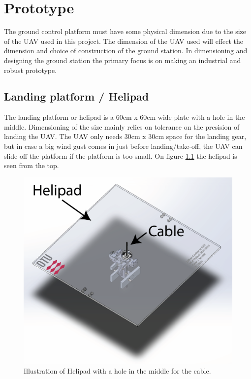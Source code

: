 
\chapter{Prototype}
The ground control platform must have some physical dimension due to the size of the UAV used in this project. The dimension of the UAV used will effect the dimension and choice of construction of the ground station. In dimensioning and designing the ground station the primary focus is on making an industrial and robust prototype. 


\section{Landing platform / Helipad}
The landing platform or helipad is a 60cm x 60cm wide plate with a hole in the middle. Dimensioning of the size mainly relies on tolerance on the presision of landing the UAV. The UAV only needs 30cm x 30cm space for the landing gear, but in case a big wind gust comes in just before landing/take-off, the UAV can slide off the platform if the platform is too small. On figure \ref{fig:helipad} the helipad is seen from the top.

\begin{figure}[H]
\centering
\includegraphics[scale=0.75]{graphics/cad/toplevel.png}
\caption{Illustration of Helipad with a hole in the middle for the cable.}
\label{fig:helipad}
\end{figure}

